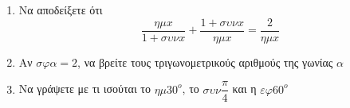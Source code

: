 \documentclass[12pt]{extarticle}
\begin{document}
\renewcommand{\labelenumii}{\roman{enumii}.}

\part*{}
\noindent

\section*{}

\begin{enumerate}
    \item Να αποδείξετε ότι $$\frac{ημx}{1+συνx}+\frac{1+συνx}{ημx}=\frac{2}{ημx}$$
    \hfill {}
    \item Αν $σφα=2$, να βρείτε τους τριγωνομετρικούς αριθμούς της γωνίας $α$
    \hfill {}
    \item Να γράψετε με τι ισούται το $ημ30^ο$, το $συν\dfrac{π}{4}$ και η $εφ60^ο$
    \hfill {}
\end{enumerate}
\end{document}
